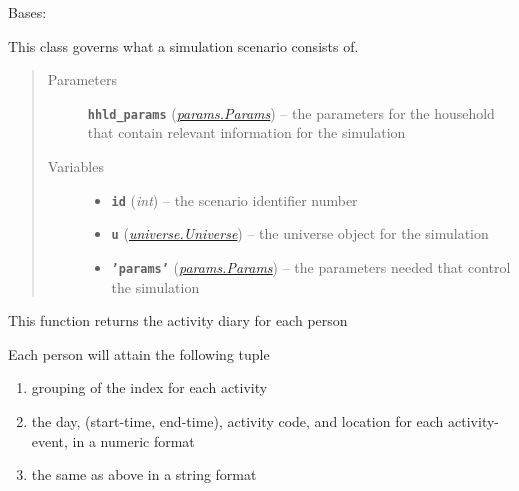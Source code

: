 \documentclass[letterpaper,10pt,english]{sphinxmanual}
\begin{document}
\begin{fulllineitems}
\label{scenario:scenario.Scenario}
Bases: 

This class governs what a simulation scenario consists of.
\begin{quote}\begin{description}
\item[{Parameters}] \leavevmode
\textbf{\texttt{hhld\_params}} ({\hyperref[params:params.Params]{\emph{\emph{params.Params}}}}) -- the parameters for the household that contain relevant information     for the simulation

\item[{Variables}] \leavevmode\begin{itemize}
\item {} 
\textbf{\texttt{id}} (\emph{int}) -- the scenario identifier number

\item {} 
\textbf{\texttt{u}} ({\hyperref[universe:universe.Universe]{\emph{\emph{universe.Universe}}}}) -- the universe object for the simulation

\item {} 
\textbf{\texttt{'params'}} ({\hyperref[params:params.Params]{\emph{\emph{params.Params}}}}) -- the parameters needed that control the simulation

\end{itemize}

\end{description}\end{quote}

\begin{fulllineitems}
\label{scenario:scenario.Scenario.activity_diary}
This function returns the activity diary for each person

Each person will attain the following tuple
\begin{enumerate}
\item {} 
grouping of the index for each activity

\item {} 
the day, (start-time, end-time), activity code, and location for each activity-event, in a numeric format

\item {} 
the same as above in a string format


\end{enumerate}
\end{fulllineitems}
\end{fulllineitems}
\end{document}
